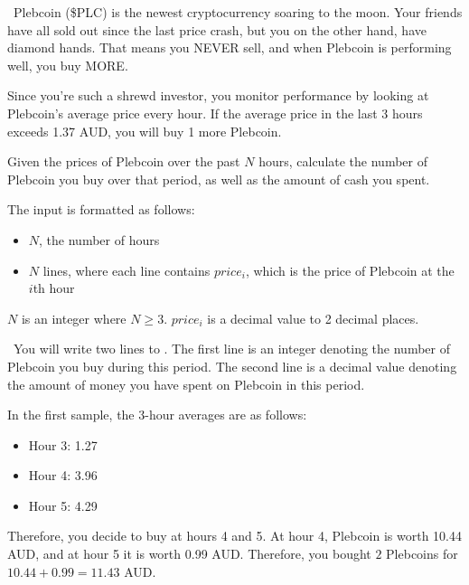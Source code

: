 

\Question\ Plebcoin (\$PLC) is the newest cryptocurrency soaring to the moon. Your friends have all sold out since the last price crash, but you on the other hand, have diamond  hands.  That means you NEVER sell, and when Plebcoin is performing well, you buy MORE.

Since you're such a shrewd investor, you monitor performance by looking at Plebcoin's average price every hour. If the average price in the last 3 hours exceeds 1.37 AUD, you will buy 1 more Plebcoin.

Given the prices of Plebcoin over the past $N$ hours, calculate the number of Plebcoin you buy over that period, as well as the amount of cash you spent.

\Input
The input is formatted as follows:
\begin{itemize}
    \item $N$, the number of hours 
    \item $N$ lines, where each line contains $price_i$, which is the price of Plebcoin at the $i$th hour
\end{itemize}

$N$ is an integer where $N \ge 3$.
$price_i$ is a decimal value to 2 decimal places.

\Output\ You will write two lines to \OUT. The first line is an integer denoting the number of Plebcoin you buy during this period. The second line is a decimal value denoting the amount of money you have spent on Plebcoin in this period.

\Sample



\Explanation In the first sample, the 3-hour averages are as follows:
\begin{itemize}
    \item Hour 3: 1.27
    \item Hour 4: 3.96
    \item Hour 5: 4.29
\end{itemize}
Therefore, you decide to buy at hours 4 and 5. At hour 4, Plebcoin is worth 10.44 AUD, and at hour 5 it is worth 0.99 AUD. Therefore, you bought $2$ Plebcoins for $10.44 + 0.99 = 11.43$ AUD.

